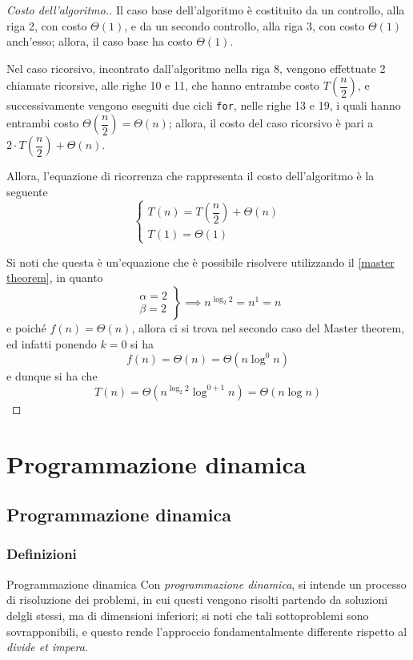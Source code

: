 \documentclass[a4paper, 12pt]{report}
\begin{document}
    \begin{proof}[Costo dell'algoritmo.]
        Il caso base dell'algoritmo è costituito da un controllo, alla riga 2, con costo $\Theta(1)$, e da un secondo controllo, alla riga 3, con costo $\Theta(1)$ anch'esso; allora, il caso base ha costo $\Theta(1)$.

        Nel caso ricorsivo, incontrato dall'algoritmo nella riga 8, vengono effettuate 2 chiamate ricorsive, alle righe 10 e 11, che hanno entrambe costo $T\left(\dfrac{n}{2}\right)$, e successivamente vengono eseguiti due cicli \texttt{for}, nelle righe 13 e 19, i quali hanno entrambi costo $\Theta\left(\dfrac{n}{2}\right) = \Theta(n)$; allora, il costo del caso ricorsivo è pari a $2 \cdot T\left(\dfrac{n}{2}\right) + \Theta(n)$.

        Allora, l'equazione di ricorrenza che rappresenta il costo dell'algoritmo è la seguente $$\left \{ \begin{array}{l} T(n) = T\left(\dfrac{n}{2}\right) + \Theta(n) \\ T(1) = \Theta(1) \end{array} \right .$$

        Si noti che questa è un'equazione che è possibile risolvere utilizzando il \cref{master theorem}, in quanto $$\left . \begin{array}{l} \alpha = 2 \\ \beta = 2 \end{array} \right \} \implies n ^ {\log_{2}{2}} = n^1 = n$$ e poiché $f(n) = \Theta(n)$, allora ci si trova nel secondo caso del Master theorem, ed infatti ponendo $k = 0$ si ha $$f(n) = \Theta(n) = \Theta(n \log^0 n)$$ e dunque si ha che $$T(n) = \Theta(n ^{\log_{2}{2}} \log ^ {0 + 1}n) = \Theta(n \log n)$$
    \end{proof}

    \chapter{Programmazione dinamica}

    \section{Programmazione dinamica}

    \subsection{Definizioni}

    \begin{frameddefn}{Programmazione dinamica}
        Con \textit{programmazione dinamica}, si intende un processo di risoluzione dei problemi, in cui questi vengono risolti partendo da soluzioni delgli stessi, ma di dimensioni inferiori; si noti che tali sottoproblemi sono sovrapponibili, e questo rende l'approccio fondamentalmente differente rispetto al \textit{divide et impera}.
    \end{frameddefn}
\end{document}

